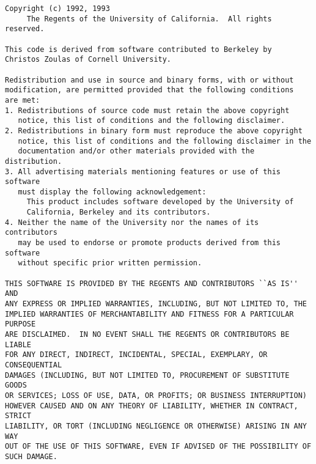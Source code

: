 \begin{verbatim}
Copyright (c) 1992, 1993
     The Regents of the University of California.  All rights reserved.

This code is derived from software contributed to Berkeley by
Christos Zoulas of Cornell University.

Redistribution and use in source and binary forms, with or without
modification, are permitted provided that the following conditions
are met:
1. Redistributions of source code must retain the above copyright
   notice, this list of conditions and the following disclaimer.
2. Redistributions in binary form must reproduce the above copyright
   notice, this list of conditions and the following disclaimer in the
   documentation and/or other materials provided with the distribution.
3. All advertising materials mentioning features or use of this software
   must display the following acknowledgement:
     This product includes software developed by the University of
     California, Berkeley and its contributors.
4. Neither the name of the University nor the names of its contributors
   may be used to endorse or promote products derived from this software
   without specific prior written permission.

THIS SOFTWARE IS PROVIDED BY THE REGENTS AND CONTRIBUTORS ``AS IS'' AND
ANY EXPRESS OR IMPLIED WARRANTIES, INCLUDING, BUT NOT LIMITED TO, THE
IMPLIED WARRANTIES OF MERCHANTABILITY AND FITNESS FOR A PARTICULAR PURPOSE
ARE DISCLAIMED.  IN NO EVENT SHALL THE REGENTS OR CONTRIBUTORS BE LIABLE
FOR ANY DIRECT, INDIRECT, INCIDENTAL, SPECIAL, EXEMPLARY, OR CONSEQUENTIAL
DAMAGES (INCLUDING, BUT NOT LIMITED TO, PROCUREMENT OF SUBSTITUTE GOODS
OR SERVICES; LOSS OF USE, DATA, OR PROFITS; OR BUSINESS INTERRUPTION)
HOWEVER CAUSED AND ON ANY THEORY OF LIABILITY, WHETHER IN CONTRACT, STRICT
LIABILITY, OR TORT (INCLUDING NEGLIGENCE OR OTHERWISE) ARISING IN ANY WAY
OUT OF THE USE OF THIS SOFTWARE, EVEN IF ADVISED OF THE POSSIBILITY OF
SUCH DAMAGE.
\end{verbatim}

\clearemptydoublepage
%
%

\begin{theindex}
\printindex
\end{theindex}



